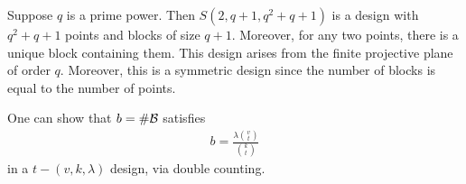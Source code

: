 \begin{example}
    Suppose $q$ is a prime power. Then $S(2,q+1,q^{2}+q+1)$ is a design with $q^{2}+q+1$ points and blocks of size $q+1$. Moreover, for any two points, there is a unique block containing them. This design arises from the finite projective plane of order $q$. Moreover, this is a symmetric design since the number of blocks is equal to the number of points.
\end{example}

One can show that $b = \# \mathcal{B}$ satisfies
\begin{align}
    b = \frac{\lambda \binom{v}{t}}{\binom{k}{t}}
\end{align}
in a $t-(v,k,\lambda)$ design, via double counting.